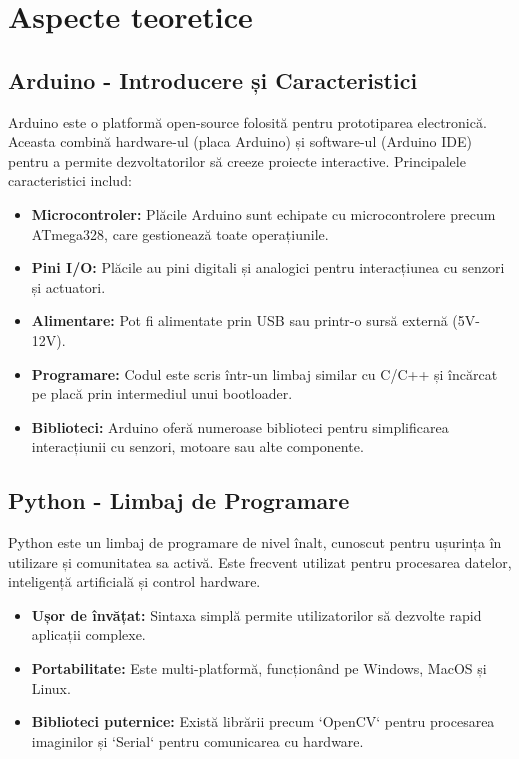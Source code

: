 \documentclass{report}
\begin{document}
\chapter{Aspecte teoretice}

\section{Arduino - Introducere și Caracteristici}
Arduino este o platformă open-source folosită pentru prototiparea electronică. Aceasta combină hardware-ul (placa Arduino) și software-ul (Arduino IDE) pentru a permite dezvoltatorilor să creeze proiecte interactive. Principalele caracteristici includ:

\begin{itemize}
    \item \textbf{Microcontroler:} Plăcile Arduino sunt echipate cu microcontrolere precum ATmega328, care gestionează toate operațiunile.
    \item \textbf{Pini I/O:} Plăcile au pini digitali și analogici pentru interacțiunea cu senzori și actuatori.
    \item \textbf{Alimentare:} Pot fi alimentate prin USB sau printr-o sursă externă (5V-12V).
    \item \textbf{Programare:} Codul este scris într-un limbaj similar cu C/C++ și încărcat pe placă prin intermediul unui bootloader.
    \item \textbf{Biblioteci:} Arduino oferă numeroase biblioteci pentru simplificarea interacțiunii cu senzori, motoare sau alte componente.
\end{itemize}

\section{Python - Limbaj de Programare}
Python este un limbaj de programare de nivel înalt, cunoscut pentru ușurința în utilizare și comunitatea sa activă. Este frecvent utilizat pentru procesarea datelor, inteligență artificială și control hardware. 

\begin{itemize}
    \item \textbf{Ușor de învățat:} Sintaxa simplă permite utilizatorilor să dezvolte rapid aplicații complexe.
    \item \textbf{Portabilitate:} Este multi-platformă, funcționând pe Windows, MacOS și Linux.
    \newpage
    \vspace*{1cm}
    \item \textbf{Biblioteci puternice:} Există librării precum `OpenCV` pentru procesarea imaginilor și `Serial` pentru comunicarea cu hardware.
\end{itemize}
\end{document}

